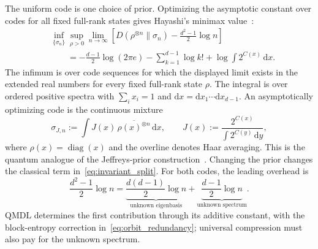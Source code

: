 \documentclass[a4paper,onecolumn,11pt]{quantumarticle}
\newcommand{\dd}{\mathrm{d}}
\begin{document}
The uniform code is one choice of prior. Optimizing the asymptotic
constant over codes for all fixed full-rank states gives Hayashi's
minimax value~\cite{hayashi2010universal}:
\begin{align}\label{eq:hayashi_minimax}
&\inf_{\{\sigma_n\}}\sup_{\rho>0}\lim_{n\to\infty}
\left[D(\rho^{\otimes n}\|\sigma_n)-\frac{d^2-1}{2}\log n\right]\nonumber\\
&\qquad=-\frac{d-1}{2}\log(2\pi e)
-\sum_{k=1}^{d-1}\log k!+\log\int 2^{C(x)}\,\dd x.
\end{align}
The infimum is over code sequences for which the displayed limit
exists in the extended real numbers for every fixed full-rank state
$\rho$.
The integral is over ordered positive spectra with $\sum_i x_i=1$
and $\dd x=\dd x_1\cdots\dd x_{d-1}$. An asymptotically optimizing
code is the continuous mixture
\[
\sigma_{J,n}:=\int J(x)\,\overline{\rho(x)^{\otimes n}}\,\dd x,
\qquad
J(x):=\frac{2^{C(x)}}{\int2^{C(y)}\,\dd y},
\]
where $\rho(x)=\operatorname{diag}(x)$ and the overline denotes
Haar averaging. This is the quantum analogue of the Jeffreys-prior
construction~\cite{clarke1990information,clarke1994jeffreys}.
Changing the prior changes the classical term
in~\eqref{eq:invariant_split}. For both codes, the leading overhead is
\[
\frac{d^2-1}{2}\log n
=\underbrace{\frac{d(d-1)}2\log n}_{\text{unknown eigenbasis}}
+\underbrace{\frac{d-1}2\log n}_{\text{unknown spectrum}}.
\]
QMDL determines the first contribution through its additive
constant, with the block-entropy correction
in~\eqref{eq:orbit_redundancy}; universal compression must also
pay for the unknown spectrum.




\end{document}
